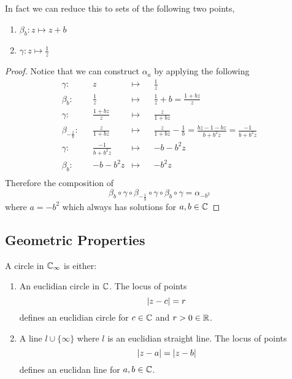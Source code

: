\documentclass{article}
\begin{document}
\begin{remark}
    In fact we can reduce this to sets of the following two points, 
    \begin{enumerate}
        \item $\beta_b: z \mapsto z + b$
        \item $\gamma: z \mapsto \frac{1}{z}$
    \end{enumerate}
\end{remark}
\begin{proof}
    Notice that we can construct $\alpha_a$ by applying the following
    \begin{align*}
        \gamma:&& z& \mapsto&& \frac{1}{z} \\
        \beta_b:&& \frac{1}{z}& \mapsto&& \frac{1}{z} + b =\frac{1 + bz}{z} \\
        \gamma:&& \frac{1 + bz}{z}& \mapsto&& \frac{z}{1 + bz} \\
        \beta_{-\frac{1}{b}}:&& \frac{z}{1 + bz}& \mapsto&& \frac{z}{1 + bz} - \frac{1}{b} = \frac{bz - 1 - bz}{b + b^2z} = \frac{-1}{b + b^2z}\\
        \gamma:&& \frac{-1}{b + b^2z}& \mapsto&& -b - b^2z \\
        \beta_b:&& -b - b^2z& \mapsto&& -b^2z \\
    \end{align*}
    Therefore the composition of
    \[
        \beta_b \circ \gamma \circ \beta_{-\frac{1}{b}} \circ \gamma \circ \beta_b \circ \gamma = \alpha_{-b^2}
    \]
    where $a = -b^2$ which always has solutions for $a, b \in \mathbb{C}$
\end{proof}


\subsection{Geometric Properties}
\begin{defi}[Circles]
    A circle in $\mathbb{C}_\infty$ is either:
    \begin{enumerate}
        \item An euclidian circle in $\mathbb{C}$. The locus of points
        \[
            \left\lvert z - c\right\rvert = r  
        \]
        defines an euclidian circle for $c \in \mathbb{C}$ and $r > 0 \in \mathbb{R}$.
        \item A line $l \cup \{\infty\}$ where $l$ is an euclidian straight line. The locus of points
        \[
            \left\lvert z - a\right\rvert = \left\lvert z - b\right\rvert  
        \]
        defines an euclidan line for $a, b \in \mathbb{C}$.
    \end{enumerate}
\end{defi}
\end{document}
